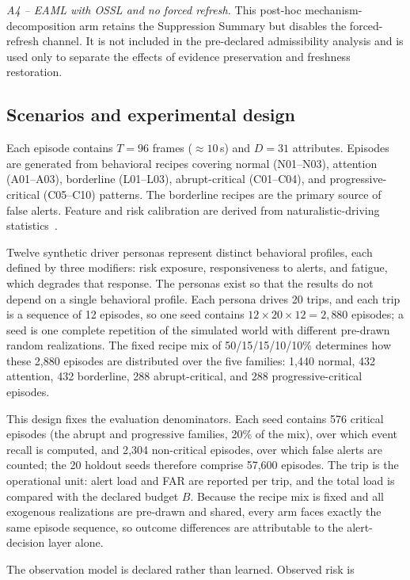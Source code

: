 \documentclass[conference]{IEEEtran}
\begin{document}
\textit{A4 -- EAML with OSSL and no forced refresh.}
This post-hoc mechanism-decomposition arm retains the Suppression
Summary but disables the forced-refresh channel. It is not included in
the pre-declared admissibility analysis and is used only to separate
the effects of evidence preservation and freshness restoration.

\subsection{Scenarios and experimental design}

Each episode contains $T{=}96$ frames (${\approx}10$\,s) and
$D{=}31$ attributes. Episodes are generated from behavioral recipes
covering normal (N01--N03), attention (A01--A03), borderline
(L01--L03), abrupt-critical (C01--C04), and progressive-critical
(C05--C10) patterns. The borderline recipes are the primary source of
false alerts. Feature and risk calibration are derived from
naturalistic-driving statistics~\cite{dingus2016shrp2}.

Twelve synthetic driver personas represent distinct behavioral
profiles, each defined by three modifiers: risk exposure, responsiveness
to alerts, and fatigue, which degrades that response. The personas
exist so that the results do not depend on a single behavioral profile.
Each persona drives 20 trips, and each trip is a sequence of 12
episodes, so one seed contains $12\times20\times12=2{,}880$ episodes;
a seed is one complete repetition of the simulated world with different
pre-drawn random realizations. The fixed recipe mix of
50/15/15/10/10\% determines how these 2{,}880 episodes are distributed
over the five families: 1{,}440 normal, 432 attention, 432 borderline,
288 abrupt-critical, and 288 progressive-critical episodes.

This design fixes the evaluation denominators. Each seed contains 576
critical episodes (the abrupt and progressive families, 20\% of the
mix), over which event recall is computed, and 2{,}304 non-critical
episodes, over which false alerts are counted; the 20 holdout seeds
therefore comprise 57{,}600 episodes. The trip is the operational unit:
alert load and FAR are reported per trip, and the total load is
compared with the declared budget $B$. Because the recipe mix is fixed
and all exogenous realizations are pre-drawn and shared, every arm
faces exactly the same episode sequence, so outcome differences are
attributable to the alert-decision layer alone.

The observation model is declared rather than learned. Observed risk is
\end{document}
